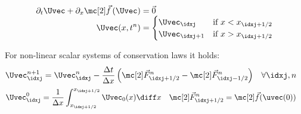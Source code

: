 \begin{defnbox}\nospacing
    \begin{defn}\label{defn:fvm_riemann_problem_for_non_linear_systems_of_conservations_laws}
            \begin{align}
              \begin{aligned}
                \partial_{t}\Uvec+\partial_{x}\fluxvec\left(\Uvec\right)&=\vec{0}\\[-1.5\jot]
                \Uvec(x,t^{n})&=\begin{cases}
                        \Uvec_{\idxj}&\text{if }x<x_{\idxj+1/2} \\
                        \Uvec_{\idxj+1}&\text{if }x>x_{\idxj+1/2}
                \end{cases}
                \end{aligned}\label{eq:riemann_problem_nonlinear_systems_of_conservation_laws}
            \end{align}
        \end{defn}
\end{defnbox}
\begin{defnbox}\nospacing
    \begin{defn}\label{defn:fvm_method_for_non-linear_systems_of_sclar_conservation_laws}
        For non-linear scalar systems of conservation laws it holds:
        \begin{align}
          &\Uvec_{\idxj}^{n+1}=\Uvec_{\idxj}^{n}-\frac{\Delta t}{\Delta x}\left(\Fluxvec^{n}_{\idxj+1/2}-\Fluxvec^{n}_{\idxj-1/2}\right)&&\forall\idxj,n
           \label{eq:finite_volume_scheme_for_non_linear_sytems_of_conservation_laws}
        \end{align}
        \begin{align*}
          &\Uvec_{\idxj}^{0}=\frac{1}{\Delta x}\int^{x_{\idxj+1/2}}_{x_{\idxj+1/2}}\Uvec_{0}(x)\diff x&&\Fluxvec_{\idxj+1/2}^{n}=\fluxvec(\uvec(0))\nonumber
        \end{align*}
    \end{defn}
\end{defnbox}


